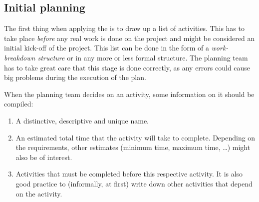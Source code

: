 \subsection{Initial planning}\label{subsec:initial_planning}
The first thing when applying the \cpm{} is to draw up a list of activities. This has to take place
\emph{before} any real work is done on the project and might be considered an initial kick-off of
the project. This list can be done in the
form of a \emph{work-breakdown structure} or in any more or less formal structure. The planning team
has to take great care that this stage is done correctly, as any errors could cause big problems
during the execution of the plan.

When the planning team decides on an activity, some information on it should be compiled:
\begin{enumerate}
  \item A distinctive, descriptive and unique name. 
  \item An estimated total time that the activity will take to complete. Depending on the
    requirements, other estimates (minimum time, maximum time, \ldots) might also be of interest.
  \item Activities that must be completed before this respective activity. It is also good practice
    to (informally, at first) write down other activities that depend on the activity.
\end{enumerate}

